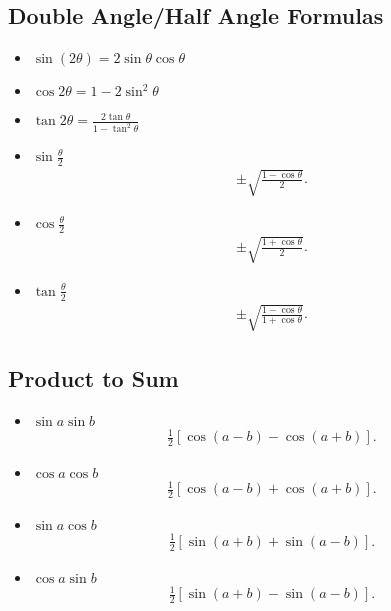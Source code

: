 \documentclass{report}
\begin{document}
      \subsection{Double Angle/Half Angle Formulas}
      \begin{itemize}
        \item $\sin{(2\theta )} = 2\sin{\theta }\cos{\theta } $
        \item $\cos{2\theta } = 1- 2\sin^{2}{\theta } $
        \item $\tan{2\theta} = \frac{2\tan{\theta }}{1-\tan^{2}{\theta }}$
        \item $\sin{\frac{\theta}{2}} $
          \begin{align*}
            \pm \sqrt{\frac{1-\cos{\theta }}{2}}
          .\end{align*}
        \item $\cos{\frac{\theta}{2}}$
          \begin{align*}
            \pm \sqrt{\frac{1+\cos{\theta }}{2}}
          .\end{align*}
        \item $\tan{\frac{\theta }{2}} $
          \begin{align*}
            \pm \sqrt{\frac{1-\cos{\theta }}{1+\cos{\theta }}}
          .\end{align*}
      \end{itemize}

      \bigbreak \noindent \bigbreak \noindent 
      \subsection{Product to Sum}
      \begin{itemize}
        \item $\sin{a}\sin{b} $
          \begin{align*}
            \frac{1}{2}[\cos{(a-b)-\cos{(a+b)}}]
          .\end{align*}
        \item $\cos{a}\cos{b}$
          \begin{align*}
            \frac{1}{2}[\cos{(a-b)} + \cos{(a+b)}]
          .\end{align*}
        \item $\sin{a}\cos{b}$
          \begin{align*}
            \frac{1}{2}[\sin{(a+b)}+\sin{(a-b)}]
          .\end{align*}
        \item $\cos{a}\sin{b}$
          \begin{align*}
            \frac{1}{2}[\sin{(a+b)} - \sin{(a-b)}]
          .\end{align*}
      \end{itemize}
\end{document}
